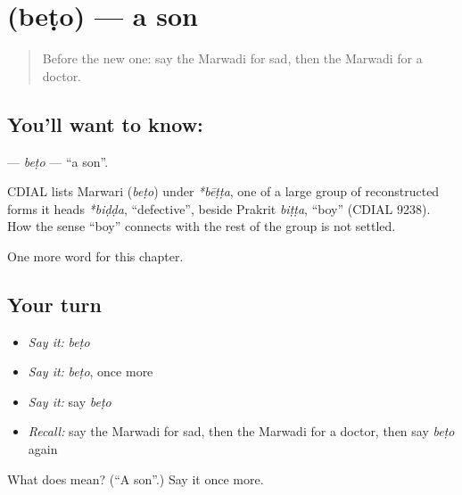 \section[\texorpdfstring{\mw{बेटो} (beṭo)}{बेटो (beṭo)}]{ (beṭo) — a son}

\label{lesson:MW-C48-beto}



\begin{quote}
Before the new one: say the Marwadi for sad, then the Marwadi for a doctor.
\end{quote}

\subsection*{You'll want to know: }
\textbf{} — \emph{beṭo} — \textquotedblleft{}a son\textquotedblright{}.

\begin{cousinweb}
CDIAL lists Marwari \textbf{} (\emph{beṭo}) under \emph{*bēṭṭa}, one of a large group of reconstructed forms it heads \emph{*biḍḍa}, \textquotedblleft{}defective\textquotedblright{}, beside Prakrit \emph{biṭṭa}, \textquotedblleft{}boy\textquotedblright{} (CDIAL 9238). How the sense \textquotedblleft{}boy\textquotedblright{} connects with the rest of the group is not settled.
\end{cousinweb}

\begin{grammarlens}[title={What you've built}]
One more word for this chapter.
\end{grammarlens}

\subsection*{Your turn}
\begin{itemize}
\raggedright
  \item \emph{Say it:} \emph{beṭo}
  \item \emph{Say it:} \emph{beṭo}, once more
  \item \emph{Say it:} say \emph{beṭo}
  \item \emph{Recall:} say the Marwadi for sad, then the Marwadi for a doctor, then say \emph{beṭo} again
\end{itemize}

\begin{tcolorbox}[breakable,colback=teal!4,colframe=teal!35!black,title={Before you move on}]
What does  mean? (\textquotedblleft{}A son\textquotedblright{}.) Say it once more.
\end{tcolorbox}
